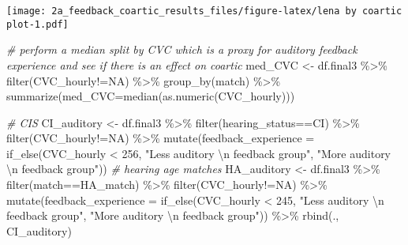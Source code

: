 \documentclass[
]{article}
\newenvironment{Shaded}{\begin{snugshade}}{\end{snugshade}}
\newcommand{\AttributeTok}[1]{\textcolor[rgb]{0.77,0.63,0.00}{#1}}
\newcommand{\CommentTok}[1]{\textcolor[rgb]{0.56,0.35,0.01}{\textit{#1}}}
\newcommand{\DecValTok}[1]{\textcolor[rgb]{0.00,0.00,0.81}{#1}}
\newcommand{\FunctionTok}[1]{\textcolor[rgb]{0.00,0.00,0.00}{#1}}
\newcommand{\NormalTok}[1]{#1}
\newcommand{\OtherTok}[1]{\textcolor[rgb]{0.56,0.35,0.01}{#1}}
\newcommand{\SpecialCharTok}[1]{\textcolor[rgb]{0.00,0.00,0.00}{#1}}
\newcommand{\StringTok}[1]{\textcolor[rgb]{0.31,0.60,0.02}{#1}}
\begin{document}
\texttt{[image: 2a\_feedback\_coartic\_results\_files/figure-latex/lena by coartic plot-1.pdf]}

\begin{Shaded}
\begin{Highlighting}[]
\CommentTok{\# perform a median split by CVC which is a proxy for auditory feedback experience and see if there is an effect on coartic}
\NormalTok{med\_CVC }\OtherTok{\textless{}{-}}\NormalTok{ df.final3 }\SpecialCharTok{\%\textgreater{}\%}
  \FunctionTok{filter}\NormalTok{(CVC\_hourly}\SpecialCharTok{!=}\StringTok{\textquotesingle{}NA\textquotesingle{}}\NormalTok{) }\SpecialCharTok{\%\textgreater{}\%}
  \FunctionTok{group\_by}\NormalTok{(match) }\SpecialCharTok{\%\textgreater{}\%}
  \FunctionTok{summarize}\NormalTok{(}\AttributeTok{med\_CVC=}\FunctionTok{median}\NormalTok{(}\FunctionTok{as.numeric}\NormalTok{(CVC\_hourly)))}

\CommentTok{\# CIS}
\NormalTok{CI\_auditory }\OtherTok{\textless{}{-}}\NormalTok{ df.final3 }\SpecialCharTok{\%\textgreater{}\%}
  \FunctionTok{filter}\NormalTok{(hearing\_status}\SpecialCharTok{==}\StringTok{\textquotesingle{}CI\textquotesingle{}}\NormalTok{) }\SpecialCharTok{\%\textgreater{}\%}
  \FunctionTok{filter}\NormalTok{(CVC\_hourly}\SpecialCharTok{!=}\StringTok{\textquotesingle{}NA\textquotesingle{}}\NormalTok{) }\SpecialCharTok{\%\textgreater{}\%}
  \FunctionTok{mutate}\NormalTok{(}\AttributeTok{feedback\_experience =} \FunctionTok{if\_else}\NormalTok{(CVC\_hourly }\SpecialCharTok{\textless{}} \DecValTok{256}\NormalTok{, }
                            \StringTok{"Less auditory }\SpecialCharTok{\textbackslash{}n}\StringTok{ feedback group"}\NormalTok{, }
                            \StringTok{"More auditory }\SpecialCharTok{\textbackslash{}n}\StringTok{ feedback group"}\NormalTok{))}
\CommentTok{\# hearing age matches}
\NormalTok{HA\_auditory }\OtherTok{\textless{}{-}}\NormalTok{ df.final3 }\SpecialCharTok{\%\textgreater{}\%}
  \FunctionTok{filter}\NormalTok{(match}\SpecialCharTok{==}\StringTok{\textquotesingle{}HA\_match\textquotesingle{}}\NormalTok{) }\SpecialCharTok{\%\textgreater{}\%}
  \FunctionTok{filter}\NormalTok{(CVC\_hourly}\SpecialCharTok{!=}\StringTok{\textquotesingle{}NA\textquotesingle{}}\NormalTok{) }\SpecialCharTok{\%\textgreater{}\%}
  \FunctionTok{mutate}\NormalTok{(}\AttributeTok{feedback\_experience =} \FunctionTok{if\_else}\NormalTok{(CVC\_hourly }\SpecialCharTok{\textless{}} \DecValTok{245}\NormalTok{, }
                            \StringTok{"Less auditory }\SpecialCharTok{\textbackslash{}n}\StringTok{ feedback group"}\NormalTok{, }
                            \StringTok{"More auditory }\SpecialCharTok{\textbackslash{}n}\StringTok{ feedback group"}\NormalTok{)) }\SpecialCharTok{\%\textgreater{}\%}
  \FunctionTok{rbind}\NormalTok{(., CI\_auditory)}



\end{Highlighting}
\end{Shaded}
\end{document}
